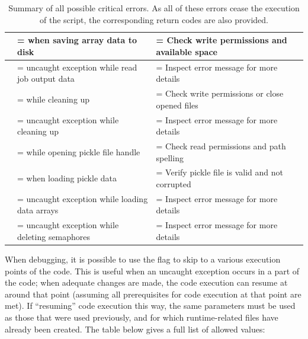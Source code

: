 \begin{table}[h]
\begin{tabularx}{1\linewidth}{|c|>{\hsize\linewidth=\hsize}Y|>{\hsize\linewidth=\hsize}Y|}
 &  when saving array data to disk & Check write permissions and available space \\ \hline
{} & uncaught exception while read job output data & Inspect error message for more details \\ \hline \hline
{} &  while cleaning up & Check write permissions or close opened files \\ \hline
{} & uncaught exception while cleaning up & Inspect error message for more details \\ \hline \hline
{} &  while opening pickle file handle & Check read permissions and path spelling \\ \hline
{} &  when loading pickle data & Verify pickle file is valid and not corrupted \\ \hline
{} & uncaught exception while loading data arrays & Inspect error message for more details \\ \hline \hline
{} & uncaught exception while deleting semaphores & Inspect error message for more details \\ \hline \hline
\end{tabularx}
\caption{Summary of all possible critical errors. As all of these errors cease the execution of the script, the corresponding return codes are also provided.}
\label{tab:troubleshooting2}
\end{table}

When debugging, it is possible to use the  flag to skip to a various execution points of the code. This is useful when an uncaught exception occurs in a part of the code; when adequate changes are made, the code execution can resume at around that point (assuming all prerequisites for code execution at that point are met). If ``resuming'' code execution this way, the same parameters must be used as those that were used previously, and for which runtime-related files have already been created. The table below gives a full list of allowed  values:

